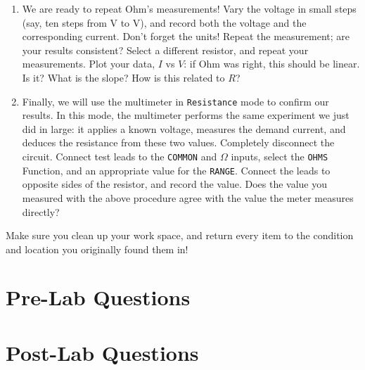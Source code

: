 \documentclass[12pt]{article}
\begin{document}
\begin{enumerate}
\begin{figure}
    \caption{The direct current circuit with ammeter inserted.}
    \label{fig:inserted}
  \end{figure}
  Next, configure the second multimeter as an ammeter: connect your
  test leads to the \texttt{COMMON} and \texttt{mA} inputs, and select
  the \texttt{DCmA} (Direct Current milliAmps) Function.  Again, you
  must choose an appropriate \texttt{RANGE}.  You measure current
  \textit{through} a device, which means you must insert the meter
  \textit{into} the circuit: you must ``cut'' the circuit, and
  ``splice'' the meter into the ``hole''.  In this case, you should
  insert the meter between the output of the power supply and the
  resistor.  Make sure the voltmeter is still connected across the
  resistor.  At this point, you should have recreated the circuit in
  Figure~\ref{fig:inserted}.  Again, slowly raise the voltage output,
  and observe the changes in the voltage and current values as
  measured on the respective meters.
\item We are ready to repeat Ohm's measurements!  Vary the voltage in
  small steps (say, ten steps from \unit[0]{V} to \unit[10]{V}), and
  record both the voltage and the corresponding current.  Don't forget
  the units!  Repeat the measurement; are your results consistent?
  Select a different resistor, and repeat your measurements.  Plot
  your data, $I$ vs $V$: if Ohm was right, this should be linear.  Is
  it?  What is the slope?  How is this related to $R$?
\item Finally, we will use the multimeter in \texttt{Resistance} mode
  to confirm our results.  In this mode, the multimeter performs the
  same experiment we just did in large: it applies a known voltage,
  measures the demand current, and deduces the resistance from these
  two values.  Completely disconnect the circuit.  Connect test leads
  to the \texttt{COMMON} and \texttt{$\Omega$} inputs, select the
  \texttt{OHMS} Function, and an appropriate value for the
  \texttt{RANGE}.  Connect the leads to opposite sides of the
  resistor, and record the value.  Does the value you measured with
  the above procedure agree with the value the meter measures
  directly?
\end{enumerate}

Make sure you clean up your work space, and return every item to the
condition and location you originally found them in!

\newpage

\section{Pre-Lab Questions}
\label{sec:prelab}

\newpage

\section{Post-Lab Questions}
\label{sec:postlab}
\end{document}
